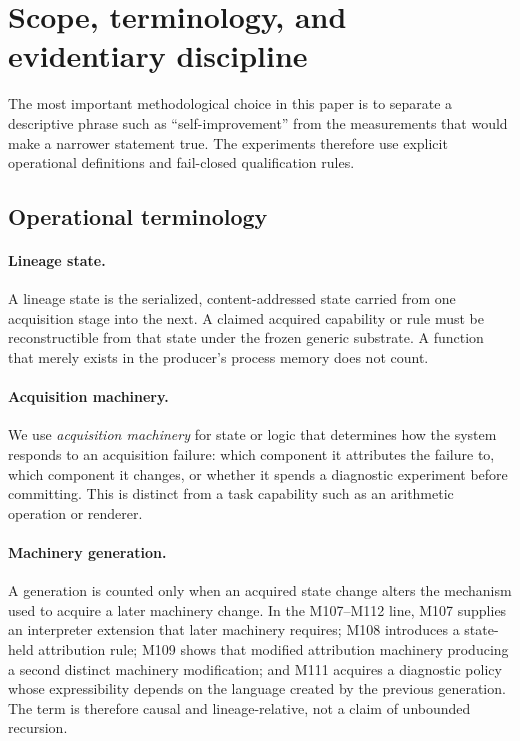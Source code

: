 \section{Scope, terminology, and evidentiary discipline}
\label{sec:discipline}
The most important methodological choice in this paper is to separate a descriptive phrase such as ``self-improvement'' from the measurements that would make a narrower statement true. The experiments therefore use explicit operational definitions and fail-closed qualification rules.

\subsection{Operational terminology}
\paragraph{Lineage state.} A lineage state is the serialized, content-addressed state carried from one acquisition stage into the next. A claimed acquired capability or rule must be reconstructible from that state under the frozen generic substrate. A function that merely exists in the producer's process memory does not count.

\paragraph{Acquisition machinery.} We use \emph{acquisition machinery} for state or logic that determines how the system responds to an acquisition failure: which component it attributes the failure to, which component it changes, or whether it spends a diagnostic experiment before committing. This is distinct from a task capability such as an arithmetic operation or renderer.

\paragraph{Machinery generation.} A generation is counted only when an acquired state change alters the mechanism used to acquire a later machinery change. In the M107--M112 line, M107 supplies an interpreter extension that later machinery requires; M108 introduces a state-held attribution rule; M109 shows that modified attribution machinery producing a second distinct machinery modification; and M111 acquires a diagnostic policy whose expressibility depends on the language created by the previous generation. The term is therefore causal and lineage-relative, not a claim of unbounded recursion.

